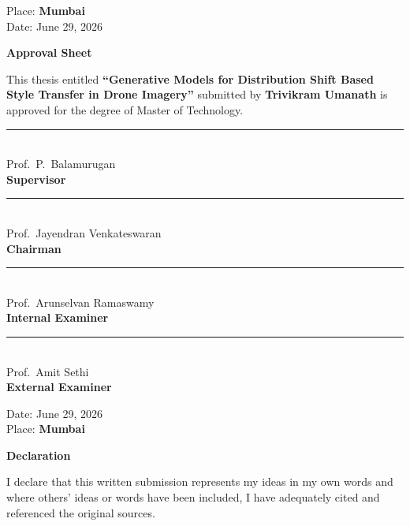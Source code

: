 \documentclass[12pt,oneside]{book}
\newcommand{\name}{Trivikram Umanath}
\newcommand{\mtptitle}{Generative Models for Distribution Shift Based Style Transfer in Drone Imagery}
\begin{document}
\vspace{1.6cm}
\noindent Place: \textbf{Mumbai}\\
Date: June 29, 2026

\clearpage
\thispagestyle{empty}
\begin{center}
{\Large\bfseries Approval Sheet}
\end{center}
\vspace{0.8cm}

\noindent This thesis entitled \textbf{``\mtptitle''} submitted by \textbf{\name} is approved for the degree of Master of Technology.

\vspace{1.4cm}
\begin{flushright}
\rule{6cm}{0.4pt}\\[0.25cm]
Prof.\ P.\ Balamurugan\\
\textbf{Supervisor}
\end{flushright}

\vspace{1.2cm}
\begin{flushright}
\rule{6cm}{0.4pt}\\[0.25cm]
Prof.\ Jayendran Venkateswaran\\
\textbf{Chairman}
\end{flushright}

\vspace{1.2cm}
\begin{flushright}
\rule{6cm}{0.4pt}\\[0.25cm]
Prof.\ Arunselvan Ramaswamy\\
\textbf{Internal Examiner}
\end{flushright}

\vspace{1.2cm}
\begin{flushright}
\rule{6cm}{0.4pt}\\[0.25cm]
Prof.\ Amit Sethi\\
\textbf{External Examiner}
\end{flushright}

\vfill
\noindent Date: June 29, 2026\\
Place: \textbf{Mumbai}

\clearpage
\thispagestyle{empty}
\begin{center}
{\Large\bfseries Declaration}
\end{center}
\vspace{0.8cm}

\noindent\hspace{1cm}I declare that this written submission represents my ideas in my own words and where others' ideas or words have been included, I have adequately cited and referenced the original sources.
\end{document}

